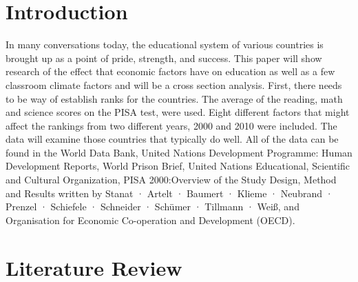 \documentclass{article}
\begin{document}
\newpage
\section{Introduction}

In many conversations today, the educational system of various countries is brought up as a point of pride, strength, and success. This paper will show research of the effect that economic factors have on education as well as a few classroom climate factors and will be a cross section analysis. First, there needs to be way of establish ranks for the countries. The average of the reading, math and science scores on the PISA test, were used. Eight different factors that might affect the rankings from two different years, 2000 and 2010 were included. The data will examine those countries that typically do well. All of the data can be found in the World Data Bank, United Nations Development Programme: Human Development Reports, World Prison Brief, United Nations Educational, Scientific and Cultural Organization, PISA 2000:Overview of the Study Design, Method and Results written by Stanat · Artelt · Baumert · Klieme · Neubrand · Prenzel · Schiefele · Schneider · Schümer · Tillmann · Weiß, and Organisation for Economic Co-operation and Development (OECD). 

\section{Literature Review}
\end{document}
